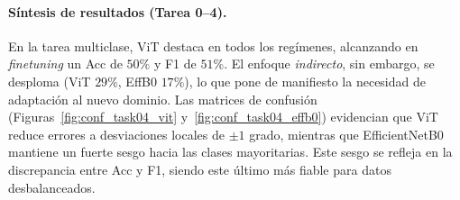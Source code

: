 \documentclass[11pt,spanish,listoffigures,listoftables]{tfgetsinf}
\begin{document}
\paragraph{Síntesis de resultados (Tarea 0--4).}
En la tarea multiclase, ViT destaca en todos los regímenes, alcanzando en \emph{finetuning} un Acc de $50\%$ y F1 de $51\%$. El enfoque \emph{indirecto}, sin embargo, se desploma (ViT $29\%$, EffB0 $17\%$), lo que pone de manifiesto la necesidad de adaptación al nuevo dominio. Las matrices de confusión (Figuras~\ref{fig:conf_task04_vit} y~\ref{fig:conf_task04_effb0}) evidencian que ViT reduce errores a desviaciones locales de $\pm 1$ grado, mientras que EfficientNetB0 mantiene un fuerte sesgo hacia las clases mayoritarias. Este sesgo se refleja en la discrepancia entre Acc y F1, siendo este último más fiable para datos desbalanceados.
\end{document}
